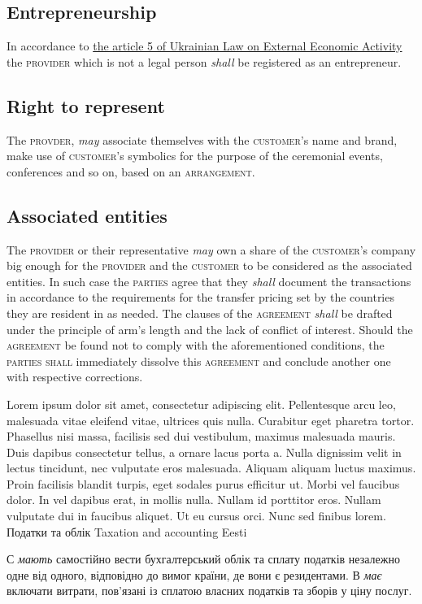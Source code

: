 \begin{Form}
\begin{paracol}{3}
{        \subsection{Entrepreneurship}
        In accordance to \href{http://zakon3.rada.gov.ua/laws/show/959-12/parao138\#o138}{the article 5 of Ukrainian Law on External Economic Activity} the \textsc{provider} which is not a legal person \textit{shall} be registered as an entrepreneur.

        \subsection{Right to represent}
        The \textsc{provder}, \textit{may} associate themselves with the \textsc{customer}'s name and brand, make use of \textsc{customer}'s symbolics for the purpose of the ceremonial events, conferences and so on, based on an \textsc{arrangement}.

        \subsection{Associated entities}
        The \textsc{provider} or their representative \textit{may} own a share of the \textsc{customer}'s company big enough for the \textsc{provider} and the \textsc{customer} to be considered as the associated entities. In such case the \textsc{parties} agree that they \textit{shall} document the transactions in accordance to the requirements for the transfer pricing set by the countries they are resident in as needed. The clauses of the \textsc{agreement} \textit{shall} be drafted under the principle of arm's length and the lack of conflict of interest. Should the \textsc{agreement} be found not to comply with the aforementioned conditions, the \textsc{parties} \textsc{shall} immediately dissolve this \textsc{agreement} and conclude another one with respective corrections.
        }
        {Lorem ipsum dolor sit amet, consectetur adipiscing elit. Pellentesque arcu leo, malesuada vitae eleifend vitae, ultrices quis nulla. Curabitur eget pharetra tortor. Phasellus nisi massa, facilisis sed dui vestibulum, maximus malesuada mauris. Duis dapibus consectetur tellus, a ornare lacus porta a. Nulla dignissim velit in lectus tincidunt, nec vulputate eros malesuada. Aliquam aliquam luctus maximus. Proin facilisis blandit turpis, eget sodales purus efficitur ut. Morbi vel faucibus dolor. In vel dapibus erat, in mollis nulla. Nullam id porttitor eros. Nullam vulputate dui in faucibus aliquet. Ut eu cursus orci. Nunc sed finibus lorem.}
      \clause
        {Податки та облік}
        {Taxation and accounting}
        {Eesti}
        {С \textit{мають} самостійно вести бухгалтерський облік та сплату податків незалежно одне від одного, відповідно до вимог країни, де вони є резидентами. В \textit{має} включати витрати, пов’язані із сплатою власних податків та зборів у ціну послуг.

}
\end{paracol}
\end{Form}
